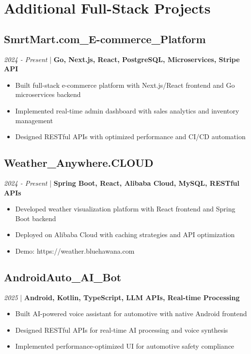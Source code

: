 \documentclass[11pt,a4paper]{article}
\begin{document}
\section*{Additional Full-Stack Projects}

\subsection*{SmrtMart.com\_E-commerce\_Platform}
\textit{2024 - Present} | \textbf{Go, Next.js, React, PostgreSQL, Microservices, Stripe API}
\begin{itemize}[noitemsep]
\item Built full-stack e-commerce platform with Next.js/React frontend and Go microservices backend
\item Implemented real-time admin dashboard with sales analytics and inventory management
\item Designed RESTful APIs with optimized performance and CI/CD automation
\end{itemize}

\subsection*{Weather\_Anywhere.CLOUD}
\textit{2024 - Present} | \textbf{Spring Boot, React, Alibaba Cloud, MySQL, RESTful APIs}
\begin{itemize}[noitemsep]
\item Developed weather visualization platform with React frontend and Spring Boot backend
\item Deployed on Alibaba Cloud with caching strategies and API optimization
\item Demo: https://weather.bluehawana.com
\end{itemize}

\subsection*{AndroidAuto\_AI\_Bot}
\textit{2025} | \textbf{Android, Kotlin, TypeScript, LLM APIs, Real-time Processing}
\begin{itemize}[noitemsep]
\item Built AI-powered voice assistant for automotive with native Android frontend
\item Designed RESTful APIs for real-time AI processing and voice synthesis
\item Implemented performance-optimized UI for automotive safety compliance
\end{itemize}
\end{document}
